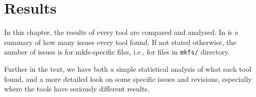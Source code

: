 
\chapter{Results}\label{chap:results}

In this chapter, the results of every tool are compared and analysed. In
 is a summary of how many issues every tool
found. If not stated otherwise, the number of issues is for mkfs-specific
files, i.e., for files in {\tt mkfs/} directory.

Further in the text, we have both a simple statistical analysis of what each
tool found, and a more detailed look on some specific issues and revisions,
especially where the tools have seriously different results.

